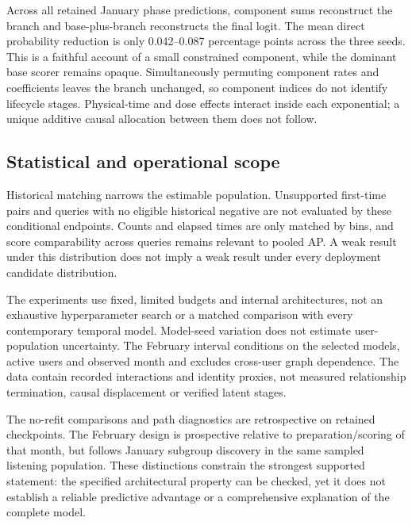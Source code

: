 \documentclass[pdflatex,sn-vancouver-num]{sn-jnl}
\theoremstyle{thmstyleone}
\begin{document}
Across all retained January phase predictions, component sums reconstruct the branch and base-plus-branch reconstructs the final logit. The mean direct probability reduction is only 0.042--0.087 percentage points across the three seeds. This is a faithful account of a small constrained component, while the dominant base scorer remains opaque. Simultaneously permuting component rates and coefficients leaves the branch unchanged, so component indices do not identify lifecycle stages. Physical-time and dose effects interact inside each exponential; a unique additive causal allocation between them does not follow.

\subsection{Statistical and operational scope}
Historical matching narrows the estimable population. Unsupported first-time pairs and queries with no eligible historical negative are not evaluated by these conditional endpoints. Counts and elapsed times are only matched by bins, and score comparability across queries remains relevant to pooled AP. A weak result under this distribution does not imply a weak result under every deployment candidate distribution.

The experiments use fixed, limited budgets and internal architectures, not an exhaustive hyperparameter search or a matched comparison with every contemporary temporal model. Model-seed variation does not estimate user-population uncertainty. The February interval conditions on the selected models, active users and observed month and excludes cross-user graph dependence. The data contain recorded interactions and identity proxies, not measured relationship termination, causal displacement or verified latent stages.

The no-refit comparisons and path diagnostics are retrospective on retained checkpoints. The February design is prospective relative to preparation/scoring of that month, but follows January subgroup discovery in the same sampled listening population. These distinctions constrain the strongest supported statement: the specified architectural property can be checked, yet it does not establish a reliable predictive advantage or a comprehensive explanation of the complete model.
\end{document}
